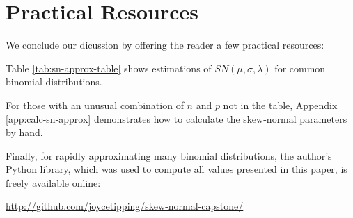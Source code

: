 \section{Practical Resources}
\label{sec:resources}

We conclude our dicussion by offering the reader a few practical resources:

Table \ref{tab:sn-approx-table} shows estimations of $SN(\mu, \sigma, \lambda)$
for common binomial distributions.

For those with an unusual combination of $n$ and $p$ not in the table, Appendix
\ref{app:calc-sn-approx} demonstrates how to calculate the skew-normal
parameters by hand.

Finally, for rapidly approximating many binomial distributions, the author's
Python library, which was used to compute all values presented in this paper,
is freely available online:

\url{http://github.com/joycetipping/skew-normal-capstone/}
